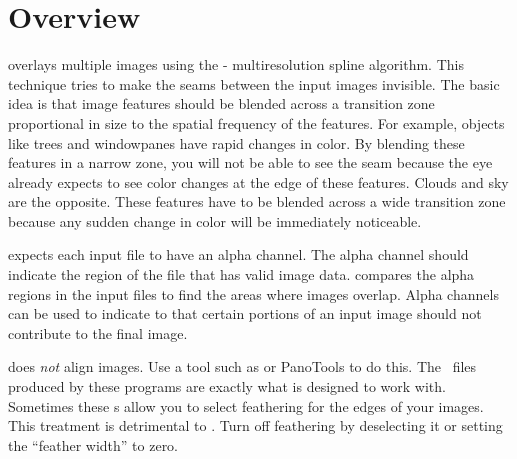 

\chapter[Overview]{Overview
  \label{sec:overview}
  }

\begin{sloppypar}
  \App{} overlays multiple images using the
  -%
  multiresolution spline%
   algorithm.\footnotemark{} This technique tries to make the
  seams between the input images invisible.  The basic idea is that
  image features should be blended across a transition zone
  proportional in size to the spatial frequency of the features.  For
  example, objects like trees and windowpanes have rapid changes in
  color.  By blending these features in a narrow zone, you will not be
  able to see the seam because the eye already expects to see color
  changes at the edge of these features.  Clouds and sky are the
  opposite.  These features have to be blended across a wide
  transition zone because any sudden change in color will be
  immediately noticeable.
\end{sloppypar}

\App{} expects each input file to have an
alpha
channel.  The alpha channel should indicate the region of the file
that has valid image data.  \App{} compares the alpha regions in the
input files to find the areas where images overlap.  Alpha channels
can be used to indicate to \App{} that certain portions of an input
image should not contribute to the final image.

\App{} does \emph{not} align images.  Use a tool such as
 or PanoTools
to do this.  The ~files produced by these programs are
exactly what \App{} is designed to work with.  Sometimes these
s allow you to select feathering for
the edges of your images.  This treatment is detrimental to \App{}.
Turn off feathering by deselecting it or setting the ``feather width''
to zero.

